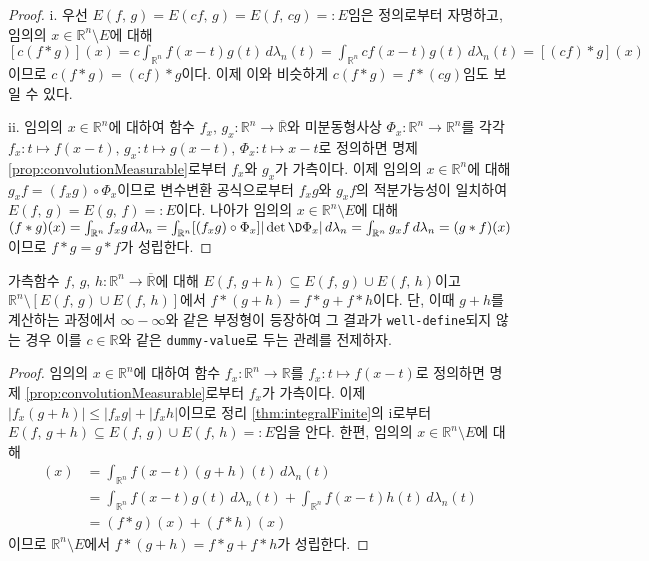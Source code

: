 \begin{proof}
    i. 우선 $E(f,\,g)=E(cf,\,g)=E(f,\,cg)=:E$임은 정의로부터 자명하고, 임의의 $x\in\mathbb{R}^n\setminus E$에 대해 $[c(f*g)](x)=c\int_{\mathbb{R}^n}f(x-t)g(t)\,d\lambda_n(t)=\int_{\mathbb{R}^n}cf(x-t)g(t)\,d\lambda_n(t)=[(cf)*g](x)$이므로 $c(f*g)=(cf)*g$이다. 이제 이와 비슷하게 $c(f*g)=f*(cg)$임도 보일 수 있다.

    ii. 임의의 $x\in\mathbb{R}^n$에 대하여 함수 $f_x,\,g_x:\mathbb{R}^n\to\overline{\mathbb{R}}$와 미분동형사상 $\Phi_x:\mathbb{R}^n\to\mathbb{R}^n$를 각각 $f_x:t\mapsto f(x-t),\,g_x:t\mapsto g(x-t),\,\Phi_x:t\mapsto x-t$로 정의하면 명제 \ref{prop:convolutionMeasurable}로부터 $f_x$와 $g_x$가 가측이다. 이제 임의의 $x\in\mathbb{R}^n$에 대해 $g_xf=(f_xg)\circ\Phi_x$이므로 변수변환 공식으로부터 $f_xg$와 $g_xf$의 적분가능성이 일치하여 $E(f,\,g)=E(g,\,f)=:E$이다. 나아가 임의의 $x\in\mathbb{R}^n\setminus E$에 대해 $(f*g)(x)=\int_{\mathbb{R}^n}f_xg\,d\lambda_n=\int_{\mathbb{R}^n}[(f_xg)\circ\Phi_x]|\det\D\Phi_x|\,d\lambda_n=\int_{\mathbb{R}^n}g_xf\,d\lambda_n=(g*f)(x)$이므로 $f*g=g*f$가 성립한다.
\end{proof}

\begin{theorem}\label{thm:convolutionDist}
    가측함수 $f,\,g,\,h:\mathbb{R}^n\to\overline{\mathbb{R}}$에 대해 $E(f,\,g+h)\subseteq E(f,\,g)\cup E(f,\,h)$이고 $\mathbb{R}^n\setminus[E(f,\,g)\cup E(f,\,h)]$에서 $f*(g+h)=f*g+f*h$이다. 단, 이때 $g+h$를 계산하는 과정에서 $\infty-\infty$와 같은 부정형이 등장하여 그 결과가 \texttt{well-define}되지 않는 경우 이를 $c\in\mathbb{R}$와 같은 \texttt{dummy-value}로 두는 관례를 전제하자.
\end{theorem}

\begin{proof}
    임의의 $x\in\mathbb{R}^n$에 대하여 함수 $f_x:\mathbb{R}^n\to\mathbb{R}$를 $f_x:t\mapsto f(x-t)$로 정의하면 명제 \ref{prop:convolutionMeasurable}로부터 $f_x$가 가측이다. 이제 $|f_x(g+h)|\leq|f_xg|+|f_xh|$이므로 정리 \ref{thm:integralFinite}의 i로부터 $E(f,\,g+h)\subseteq E(f,\,g)\cup E(f,\,h)=:E$임을 안다. 한편, 임의의 $x\in\mathbb{R}^n\setminus E$에 대해
    \begin{align*}
        [f*(g+h)](x)&=\int_{\mathbb{R}^n}f(x-t)(g+h)(t)\,d\lambda_n(t)\\
        &=\int_{\mathbb{R}^n}f(x-t)g(t)\,d\lambda_n(t)+\int_{\mathbb{R}^n}f(x-t)h(t)\,d\lambda_n(t)\\
        &=(f*g)(x)+(f*h)(x)
    \end{align*}
    이므로 $\mathbb{R}^n\setminus E$에서 $f*(g+h)=f*g+f*h$가 성립한다.
\end{proof}

